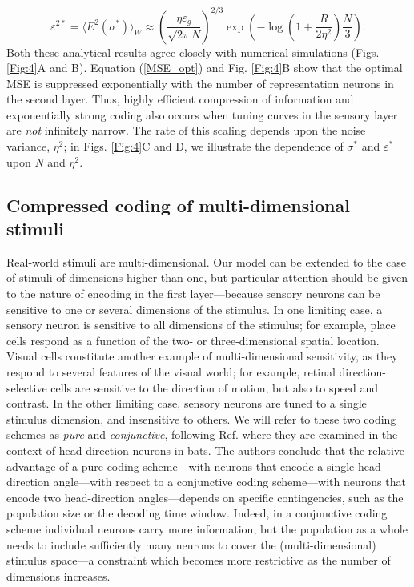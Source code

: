 \documentclass[a4paper]{article}%
\begin{document}
\begin{equation}
\varepsilon^{2\ast}=\langle E^{2}(\sigma^{\ast})\rangle_{W}\approx\left(
\frac{\eta\bar{\varepsilon}_{g}}{\sqrt{2\pi}N}\right)  ^{2/3}\exp{\left(
-\log\left(  1+\frac{R}{2\eta^{2}}\right)  \frac{N}{3}\right)  }.
\label{MSE_opt}%
\end{equation}
Both these analytical results agree closely with numerical simulations (Figs.
\ref{Fig:4}A and B). Equation (\ref{MSE_opt}) and Fig. \ref{Fig:4}B show that
the optimal MSE is suppressed exponentially with the number of representation
neurons in the second layer. Thus, highly efficient compression of information
and exponentially strong coding also occurs when tuning curves in the sensory
layer are \textit{not} infinitely narrow. The rate of this scaling depends
upon the noise variance, $\eta^{2}$; in Figs. \ref{Fig:4}C and D, we
illustrate the dependence of $\sigma^{\ast}$ and $\varepsilon^*$ upon $N$ and $\eta^{2}$.

\subsection*{Compressed coding of multi-dimensional stimuli}

Real-world stimuli are multi-dimensional. Our model can be extended to the
case of stimuli of dimensions higher than one, but particular attention should
be given to the nature of encoding in the first layer---because sensory
neurons can be sensitive to one or several dimensions of the stimulus. In one
limiting case, a sensory neuron is sensitive to all dimensions of the
stimulus; for example, place cells respond as a function of the two- or
three-dimensional spatial location. Visual cells constitute another example of
multi-dimensional sensitivity, as they respond to several features of the
visual world; for example, retinal direction-selective cells are sensitive to
the direction of motion, but also to speed and contrast. In the other limiting
case, sensory neurons are tuned to a single stimulus dimension, and
insensitive to others. We will refer to these two coding schemes as
\textit{pure} and \textit{conjunctive}, following Ref.
\cite{Finkelstein2018OptimalBats} where they are examined in the context of
head-direction neurons in bats. The authors conclude that the relative
advantage of a pure coding scheme---with neurons that encode a single
head-direction angle---with respect to a conjunctive coding scheme---with
neurons that encode two head-direction angles---depends on specific
contingencies, such as the population size or the decoding time window.
Indeed, in a conjunctive coding scheme individual neurons carry more
information, but the population as a whole needs to include sufficiently many
neurons to cover the (multi-dimensional) stimulus space---a constraint which
becomes more restrictive as the number of dimensions increases.
\end{document}
